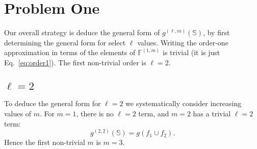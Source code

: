 \documentclass[11pt]{article}
\newcommand{\gxn}[1]{g\left(#1\right)}
\newcommand{\setf}{\mathbb{F}}
\newcommand{\setfn}[1]{\setf^{(#1)}}
\newcommand{\sets}{\mathbb{S}}
\newcommand{\gapprox}[1]{g^{(#1)}\left(\sets\right)}
\begin{document}
\section{Problem One}

Our overall strategy is deduce the general form of $\gapprox{\ell,m}$,
by first determining the general form for select $\ell$ values. Writing the 
order-one approximation in terms of the elements of $\setfn{1,m}$ is
trivial (it is just Eq.~\ref{eq:order1}). The first non-trivial order is 
$\ell=2$. 

\subsection{$\ell=2$}

To deduce the general form for $\ell=2$ we systematically consider increasing 
values of $m$. For $m=1$, there is no $\ell=2$ term, and $m=2$ has a trivial 
$\ell=2$ term:
\begin{equation}
	\gapprox{2,2} = \gxn{f_1\cup f_2}.
\end{equation}
Hence the first non-trivial $m$ is $m=3$.

\newcommand{\Di}{f_{12}}
\newcommand{\Dj}{f_{13}}
\newcommand{\Dk}{f_{23}}
\newcommand{\Itwo}[2]{#1\cap #2}
\newcommand{\Ithree}[3]{\Itwo{#1}{#2}\cap #3}
\newcommand{\IDiDj}{\Itwo{\Di}{\Dj}}
\newcommand{\IDiDk}{\Itwo{\Di}{\Dk}}
\newcommand{\IDjDk}{\Itwo{\Dj}{\Dk}}
\newcommand{\IDiDjDk}{\Ithree{\Di}{\Dj}{\Dk}}
\newcommand{\itwo}[2]{\left(#1\cap #2\right)}
\newcommand{\Ii}{s_{12}}
\newcommand{\Ij}{s_{13}}
\newcommand{\Ik}{s_{23}}
\end{document}
